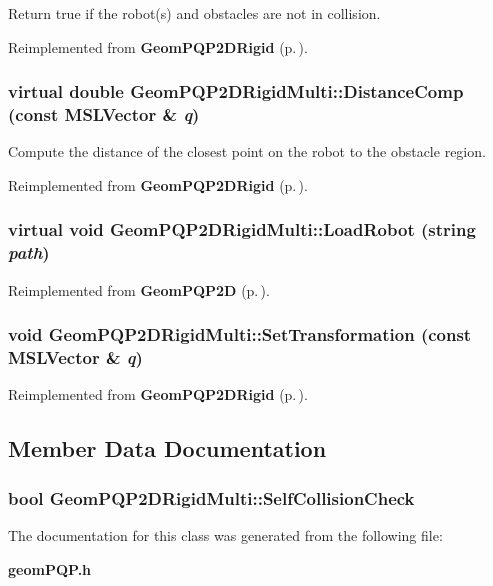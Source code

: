 Return true if the robot(s) and obstacles are not in collision.



Reimplemented from {\bf Geom\-PQP2DRigid} {\rm (p.\,\pageref{class_GeomPQP2DRigid_a2})}.
\subsubsection{\setlength{\rightskip}{0pt plus 5cm}virtual double Geom\-PQP2DRigid\-Multi::Distance\-Comp (const {\bf MSLVector} \& {\em q})\hspace{0.3cm}{\tt  [virtual]}}\label{class_GeomPQP2DRigidMulti_a3}


Compute the distance of the closest point on the robot to the obstacle region.



Reimplemented from {\bf Geom\-PQP2DRigid} {\rm (p.\,\pageref{class_GeomPQP2DRigid_a3})}.
\subsubsection{\setlength{\rightskip}{0pt plus 5cm}virtual void Geom\-PQP2DRigid\-Multi::Load\-Robot (string {\em path})\hspace{0.3cm}{\tt  [virtual]}}\label{class_GeomPQP2DRigidMulti_a4}




Reimplemented from {\bf Geom\-PQP2D} {\rm (p.\,\pageref{class_GeomPQP2D_a3})}.
\subsubsection{\setlength{\rightskip}{0pt plus 5cm}void Geom\-PQP2DRigid\-Multi::Set\-Transformation (const {\bf MSLVector} \& {\em q})}\label{class_GeomPQP2DRigidMulti_a5}




Reimplemented from {\bf Geom\-PQP2DRigid} {\rm (p.\,\pageref{class_GeomPQP2DRigid_a5})}.

\subsection{Member Data Documentation}
\subsubsection{\setlength{\rightskip}{0pt plus 5cm}bool Geom\-PQP2DRigid\-Multi::Self\-Collision\-Check}\label{class_GeomPQP2DRigidMulti_m0}




The documentation for this class was generated from the following file:\begin{CompactItemize}
\item 
{\bf geom\-PQP.h}\end{CompactItemize}
